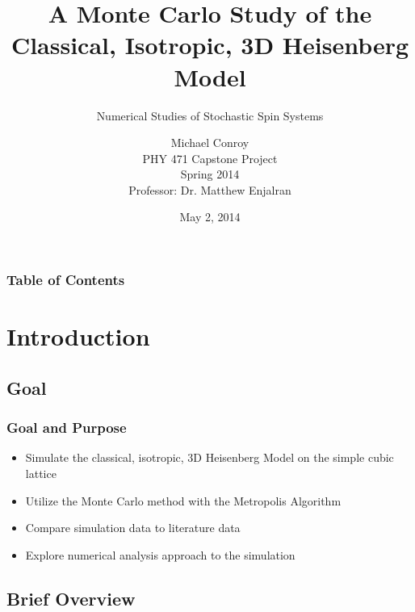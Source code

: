 \documentclass{beamer}
\title[]{A Monte Carlo Study of the Classical, Isotropic, 3D Heisenberg Model}
\subtitle{Numerical Studies of Stochastic Spin Systems}
\author[]{Michael Conroy\\
  PHY 471 Capstone Project \\
  Spring 2014 \\
  Professor: Dr. Matthew Enjalran}
\date{May 2, 2014}
\begin{document}
	\begin{frame}
	\titlepage
	\end{frame}

	\begin{frame}
		\frametitle{Table of Contents}
		\tableofcontents
	\end{frame}

	\section{Introduction}
	
	\subsection{Goal}
  \begin{frame}
    \frametitle{Goal and Purpose}
    	\begin{itemize}
    		\item Simulate the classical, isotropic, 3D Heisenberg Model on the simple cubic lattice
    		\item Utilize the Monte Carlo method with the Metropolis Algorithm
    		\item Compare simulation data to literature data
    		\item Explore numerical analysis approach to the simulation
    	\end{itemize}
  \end{frame}
  
  \subsection{Brief Overview}
\end{document}
